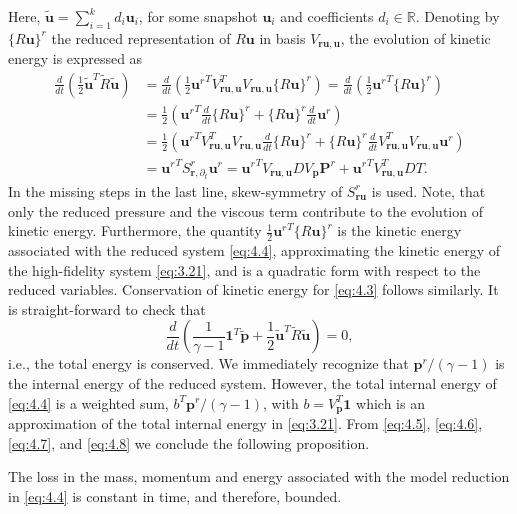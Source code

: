 Here, $\tilde{\mathbf u} = \sum_{i=1}^k d_i \mathbf u_i$, for some snapshot $\mathbf u_i$ and coefficients $d_i \in \mathbb R$. Denoting by $\{ R \mathbf u\}^r$ the reduced representation of $R\mathbf u$ in basis $V_{\mathbf r \mathbf u , \mathbf u}$, the evolution of kinetic energy is expressed as
\begin{equation} \label{eq:4.7}
	\begin{aligned}
	\frac{d}{dt}\left( \frac 1 2 \tilde{\mathbf u}^T \tilde{ R } \tilde {\mathbf u} \right) &= \frac{d}{dt}\left( \frac 1 2 {\mathbf u^r}^T V_{\mathbf r \mathbf u , \mathbf u}^T V_{\mathbf r \mathbf u , \mathbf u} \{ R \mathbf u\}^r \right) = \frac{d}{dt}\left( \frac 1 2 {\mathbf u^r}^T \{ R \mathbf u\}^r \right) \\
	&= \frac 1 2 \left( {\mathbf u^r}^T \frac{d}{dt} \{ R \mathbf u \}^r + \{ R \mathbf u \}^r \frac{d}{dt} \mathbf u^r \right) \\
	&= \frac 1 2 \left( {\mathbf u^r}^T V_{\mathbf r \mathbf u , \mathbf u}^T V_{\mathbf r \mathbf u , \mathbf u} \frac{d}{dt} \{ R \mathbf u \}^r + \{ R \mathbf u \}^r \frac{d}{dt} V_{\mathbf r \mathbf u , \mathbf u}^T V_{\mathbf r \mathbf u , \mathbf u} \mathbf u^r \right) \\
	&= {\mathbf u^r}^T S^r_{\mathbf r, \partial_t} \mathbf u^r = { \mathbf u^r }^T V_{\mathbf r \mathbf u , \mathbf u} D V_{\mathbf p} \mathbf P^r + { \mathbf u^r }^T V_{\mathbf r \mathbf u , \mathbf u}^T D T.
	\end{aligned}
\end{equation}
In the missing steps in the last line, skew-symmetry of $S_{\mathbf r \mathbf u}^r$ is used. Note, that only the reduced pressure and the viscous term contribute to the evolution of kinetic energy. Furthermore, the quantity $ \frac 1 2 {\mathbf u^r}^T \{ R \mathbf u\}^r$ is the kinetic energy associated with the reduced system \eqref{eq:4.4}, approximating the kinetic energy of the high-fidelity system \eqref{eq:3.21}, and is a quadratic form with respect to the reduced variables. Conservation of kinetic energy for \eqref{eq:4.3} follows similarly. It is  straight-forward to check that
\begin{equation} \label{eq:4.8}
	\frac{d}{dt} \left( \frac{1}{\gamma - 1} \mathbf 1^T \tilde{\mathbf p} + \frac{1}{2} \tilde{\mathbf u}^T \tilde R \tilde{\mathbf u} \right) = 0,
\end{equation}
i.e., the total energy is conserved. We immediately recognize that $ \mathbf p^r /(\gamma - 1)$ is the internal energy of the reduced system. However, the total internal energy of \eqref{eq:4.4} is a weighted sum, $ b^T\mathbf p^r /(\gamma - 1)$, with $b = V_{\mathbf p}^T \mathbf 1$ which is an approximation of the total internal energy in \eqref{eq:3.21}. From \eqref{eq:4.5}, \eqref{eq:4.6}, \eqref{eq:4.7}, and \eqref{eq:4.8} we conclude the following proposition.
\begin{proposition}
	The loss in the mass, momentum and energy associated with the model reduction in \eqref{eq:4.4} is constant in time, and therefore, bounded.
\end{proposition}

